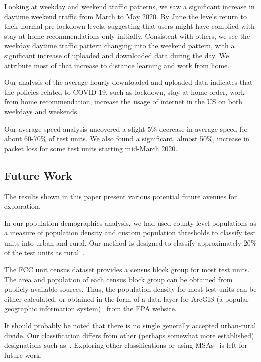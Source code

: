 \documentclass[conference,10pt]{IEEEtran}
\begin{document}
Looking at weekday and weekend traffic patterns, we saw a significant increase in daytime weekend traffic from March to May 2020. By June the levels return to their normal pre-lockdown levels, suggesting that users might have complied with stay-at-home recommendations only initially. Consistent with others, we see the weekday daytime traffic pattern changing into the weekend pattern, with a significant increase of uploaded and downloaded data during the day. We attribute most of that increase to distance learning and work from home.

Our analysis of the average hourly downloaded and uploaded data indicates that the policies related to COVID-19, such as lockdown, stay-at-home order, work from home recommendation, increase the usage of internet in the \gls{US} on both weekdays and weekends.

Our average speed analysis uncovered a slight 5\% decrease in average speed for about 60-70\% of test units. We also found a significant, almost 50\%, increase in packet loss for some test units starting mid-March 2020.

\subsection{Future Work}\label{sec:future-work}

The results shown in this paper present various potential future avenues for exploration.

In our population demographics analysis, we had used county-level populations as a measure of population density and custom population thresholds to classify test units into urban and rural. Our method is designed to classify approximately 20\% of the test units as rural~\cite{metroRural}.

The \gls{FCC} unit census dataset provides a census block group for most test units. The area and population of each census block group can be obtained from publicly-available sources. Thus, the population density for most test units can be either calculated, or obtained in the form of a data layer for ArcGIS (a popular geographic information system)~\cite{arcgis} from the \gls{EPA} website.

It should probably be noted that there is no single generally accepted urban-rural divide. Our classification differs from other (perhaps somewhat more established) designations such as~\cite{rural-classifications}. Exploring other classifications or using \glspl{MSA}~\cite{msa} is left for future work.
\end{document}

